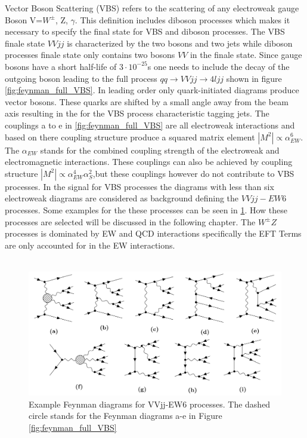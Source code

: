 \documentclass[../Bachelorarbeit.tex]{subfiles}
\begin{document}
Vector Boson Scattering (VBS) refers to the scattering of any electroweak gauge Boson V=$W^{\pm}$, Z, $\gamma$. This
definition includes diboson processes which makes it necessary to specify the final state for VBS and diboson processes.
The VBS finale state $VVjj$ is characterized by the two bosons and two jets while diboson processes finale state only contains
two bosons $VV$ in the finale state. Since gauge bosons have a short half-life of $3 \cdot 10^{-25}$s one needs to include the
decay of the outgoing boson leading to the full process $qq\rightarrow VVjj\rightarrow 4ljj$ shown in figure \ref{fig:feynman_full_VBS}.
In leading order only quark-initiated diagrams produce vector bosons. These quarks are shifted by a small angle away from
the beam axis resulting in the for the VBS process characteristic tagging jets. The couplings a to e in \ref{fig:feynman_full_VBS}
are all electroweak interactions and based on there coupling structure produce a squared matrix element
$\left\lvert M^{2} \right\rvert \propto \alpha_{EW}^{6}$. The $\alpha_{EW}$ stands for the combined coupling strength of
the electroweak and electromagnetic interactions. These couplings can also be achieved by coupling structure
$\left\lvert M^{2} \right\rvert \propto \alpha_{EW}^{4}\alpha_{S}^{2}$,but these couplings however do not contribute to VBS processes.
In the signal for VBS processes the diagrams with less than six electroweak diagrams are considered as background defining the $VVjj-EW6$ processes.
Some examples for the these processes can be seen in \ref{fig:EW6}. How these processes are selected will be discussed in the following chapter.
The $W^{\pm}Z$ processes is dominated by EW and QCD interactions specifically the EFT Terms are only accounted for in the EW interactions.\\\\
\begin{figure}[h]
    \centering
    \includegraphics[width=\textwidth]{images/EW6.png}
    \caption{Example Feynman diagrams for VVjj-EW6 processes. The dashed circle stands for the Feynman diagrams a-e in Figure \ref*{fig:feynman_full_VBS}}
    \label{fig:EW6}
\end{figure}
\end{document}
